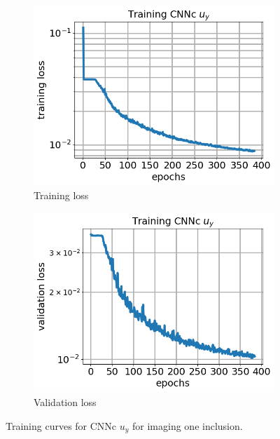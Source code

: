 \documentclass[12pt]{article}
\newcommand{\nhgfigheight}{4.0cm}
\begin{document}
%
\begin{figure}[h]
  \centering
  \begin{subfigure}[b]{0.45\linewidth}
    \includegraphics[totalheight=\nhgfigheight]{Figures/final1c/training/uy/field_imagesy_plot_loss.png}
    \caption{Training loss}
  \end{subfigure}
  \begin{subfigure}[b]{0.45\linewidth}
    \includegraphics[totalheight=\nhgfigheight]{Figures/final1c/training/uy/field_imagesy_plot_val_loss.png}
    \caption{Validation loss}
  \end{subfigure}
\caption{\label{fig:oneinctanh:trainuy} Training curves for CNNc $u_y$ for imaging one inclusion.}
\end{figure}
\end{document}
